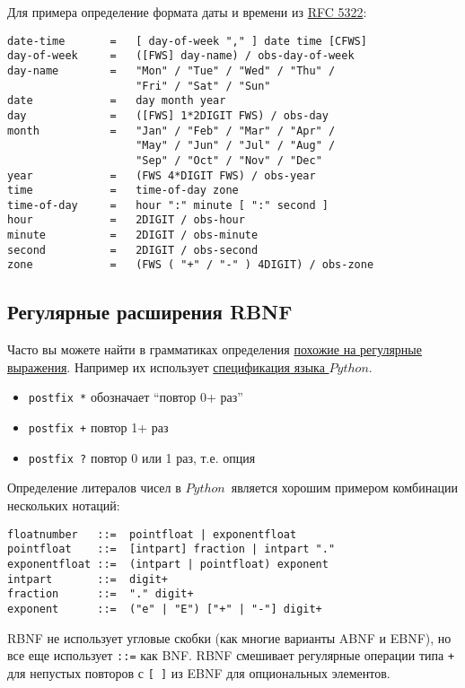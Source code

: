 \documentclass[oneside,10pt]{article}
\newcommand{\py}{$Python$}
\begin{document}
\clearpage
Для примера определение формата даты и времени из
\href{http://tools.ietf.org/html/rfc5322#section-1.2}{RFC 5322}:
\begin{verbatim}
date-time       =   [ day-of-week "," ] date time [CFWS]
day-of-week     =   ([FWS] day-name) / obs-day-of-week
day-name        =   "Mon" / "Tue" / "Wed" / "Thu" /
                    "Fri" / "Sat" / "Sun"
date            =   day month year
day             =   ([FWS] 1*2DIGIT FWS) / obs-day
month           =   "Jan" / "Feb" / "Mar" / "Apr" /
                    "May" / "Jun" / "Jul" / "Aug" /
                    "Sep" / "Oct" / "Nov" / "Dec"
year            =   (FWS 4*DIGIT FWS) / obs-year
time            =   time-of-day zone
time-of-day     =   hour ":" minute [ ":" second ]
hour            =   2DIGIT / obs-hour
minute          =   2DIGIT / obs-minute
second          =   2DIGIT / obs-second
zone            =   (FWS ( "+" / "-" ) 4DIGIT) / obs-zone
\end{verbatim}

\clearpage
\subsection{Регулярные расширения RBNF}

Часто вы можете найти в грамматиках определения
\href{http://matt.might.net/articles/sculpting-text/}{похожие на регулярные
выражения}.
Например их использует
\href{http://docs.python.org/3/reference/lexical_analysis.html}{спецификация
языка \py}.

\begin{itemize}[nosep]
  \item \verb|postfix *| обозначает ``повтор 0+ раз''
  \item \verb|postfix +| повтор 1+ раз
  \item \verb|postfix ?| повтор 0 или 1 раз, т.е. опция
\end{itemize}

Определение литералов чисел в \py\ является хорошим примером комбинации
нескольких нотаций:
\begin{verbatim}
floatnumber   ::=  pointfloat | exponentfloat
pointfloat    ::=  [intpart] fraction | intpart "."
exponentfloat ::=  (intpart | pointfloat) exponent
intpart       ::=  digit+
fraction      ::=  "." digit+
exponent      ::=  ("e" | "E") ["+" | "-"] digit+
\end{verbatim}

RBNF не использует угловые скобки (как многие варианты ABNF и EBNF), но все еще
использует \verb|::=| как BNF. RBNF смешивает регулярные операции типа \verb|+|
для непустых повторов с \verb|[ ]| из EBNF для опциональных элементов.
\end{document}
